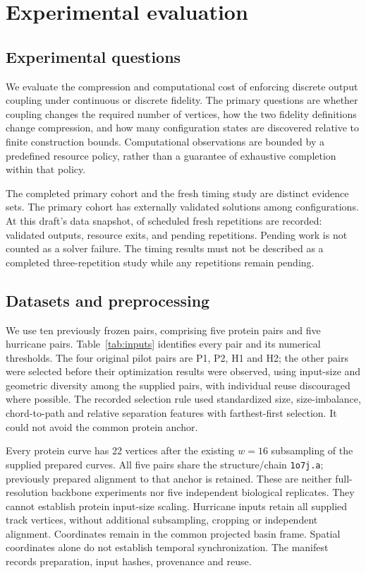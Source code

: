 \chapter{Experimental evaluation}
\label{chap:experiments}

\section{Experimental questions}
We evaluate the compression and computational cost of enforcing discrete output coupling under continuous or discrete fidelity.
The primary questions are whether coupling changes the required number of vertices,
how the two fidelity definitions change compression,
and how many configuration states are discovered relative to finite construction bounds.
Computational observations are bounded by a predefined resource policy, rather than a guarantee of exhaustive completion within that policy.

The completed primary cohort and the fresh timing study are distinct evidence sets. The primary cohort has \PrimaryValid{} externally validated solutions among \PrimaryCount{} configurations. At this draft's data snapshot, \TimingFinished{} of \TimingPlanned{} scheduled fresh repetitions are recorded: \TimingValid{} validated outputs, \TimingResource{} resource exits, and \TimingPending{} pending repetitions. Pending work is not counted as a solver failure. The timing results must not be described as a completed three-repetition study while any repetitions remain pending.

\section{Datasets and preprocessing}
We use ten previously frozen pairs, comprising five protein pairs and five hurricane pairs. Table~\ref{tab:inputs} identifies every pair and its numerical thresholds. The four original pilot pairs are P1, P2, H1 and H2; the other pairs were selected before their optimization results were observed, using input-size and geometric diversity among the supplied pairs, with individual reuse discouraged where possible. The recorded selection rule used standardized size, size-imbalance, chord-to-path and relative separation features with farthest-first selection. It could not avoid the common protein anchor.

Every protein curve has 22 vertices after the existing $w=16$ subsampling of the supplied prepared curves. All five pairs share the structure/chain \texttt{1o7j.a}; previously prepared alignment to that anchor is retained. These are neither full-resolution backbone experiments nor five independent biological replicates. They cannot establish protein input-size scaling. Hurricane inputs retain all supplied track vertices, without additional subsampling, cropping or independent alignment. Coordinates remain in the common projected basin frame. Spatial coordinates alone do not establish temporal synchronization. The manifest records preparation, input hashes, provenance and reuse.


